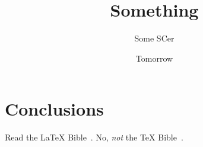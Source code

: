\documentclass[a4paper]{article}
\title{Something}
\author{Some SCer}
\date{Tomorrow}
\begin{document}
\maketitle

\section{Conclusions}
Read the {\LaTeX} Bible~\cite{Lamport:LDP86}.
No, \emph{not} the {\TeX} Bible~\cite{Knuth:TB84}.



\end{document}
